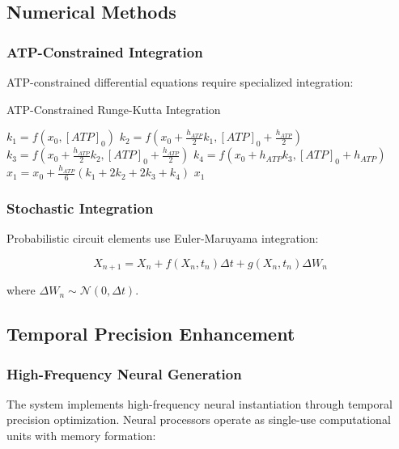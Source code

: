 \documentclass[12pt,a4paper]{article}
\begin{document}
\subsection{Numerical Methods}

\subsubsection{ATP-Constrained Integration}

ATP-constrained differential equations require specialized integration:

\begin{algorithm}
\caption{ATP-Constrained Runge-Kutta Integration}
\begin{algorithmic}
    \State $k_1 = f(x_0, [ATP]_0)$
    \State $k_2 = f(x_0 + \frac{h_{ATP}}{2}k_1, [ATP]_0 + \frac{h_{ATP}}{2})$
    \State $k_3 = f(x_0 + \frac{h_{ATP}}{2}k_2, [ATP]_0 + \frac{h_{ATP}}{2})$
    \State $k_4 = f(x_0 + h_{ATP}k_3, [ATP]_0 + h_{ATP})$
    \State $x_1 = x_0 + \frac{h_{ATP}}{6}(k_1 + 2k_2 + 2k_3 + k_4)$
    \State \Return $x_1$
\EndProcedure
\end{algorithmic}
\end{algorithm}

\subsubsection{Stochastic Integration}

Probabilistic circuit elements use Euler-Maruyama integration:

\begin{equation}
X_{n+1} = X_n + f(X_n, t_n)\Delta t + g(X_n, t_n)\Delta W_n
\end{equation}

where $\Delta W_n \sim \mathcal{N}(0, \Delta t)$.

\subsection{Temporal Precision Enhancement}

\subsubsection{High-Frequency Neural Generation}

The system implements high-frequency neural instantiation through temporal precision optimization. Neural processors operate as single-use computational units with memory formation:
\end{document}
